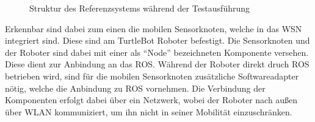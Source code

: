 \begin{figure}[t]
  \begin{center}
  \end{center}
  \caption{Struktur des Referenzsystems während der Testausführung}
  \label{fig:referencetopo}
\end{figure}

Erkennbar sind dabei zum einen die mobilen Sensorknoten, welche in das \gls{WSN} integriert sind.
Diese sind am TurtleBot Roboter befestigt. Die Sensorknoten und der Roboter
sind dabei mit einer als ``Node'' bezeichneten Komponente versehen. Diese dient zur
Anbindung an das ROS. Während der Roboter direkt druch ROS betrieben wird, sind
für die mobilen Sensorknoten zusätzliche Softwareadapter nötig, welche die
Anbindung zu ROS vornehmen. Die Verbindung der Komponenten erfolgt dabei über ein
Netzwerk, wobei der Roboter nach außen über WLAN kommuniziert, um ihn nicht in seiner
Mobilität einzuschränken.
